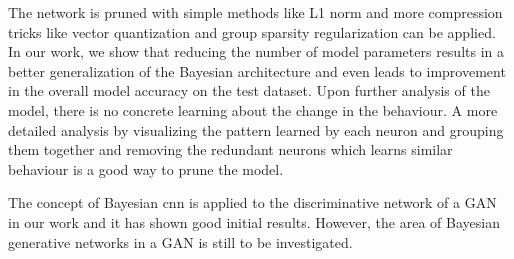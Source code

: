 \newline The network is pruned with simple methods like L1 norm and more compression tricks like vector quantization \cite{DBLP:journals/corr/GongLYB14} and group sparsity regularization  \cite{DBLP:conf/nips/AlvarezS16} can be applied. In our work, we show that reducing the number of model parameters results in a better generalization of the Bayesian architecture and even leads to improvement in the overall model accuracy on the test dataset. Upon further analysis of the model, there is no concrete learning about the change in the behaviour. A more detailed analysis by visualizing the pattern learned by each neuron and grouping them together and removing the redundant neurons which learns similar behaviour is a good way to prune the model.

\newline The concept of Bayesian \ac{cnn} is applied to the discriminative network of a GAN in our work and it has shown good initial results. However, the area of Bayesian generative networks in a GAN is still to be investigated.